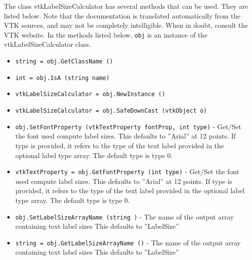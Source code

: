 The class vtkLabelSizeCalculator has several methods that can be used.
  They are listed below.
Note that the documentation is translated automatically from the VTK sources,
and may not be completely intelligible.  When in doubt, consult the VTK website.
In the methods listed below, \verb|obj| is an instance of the vtkLabelSizeCalculator class.
\begin{itemize}
\item  \verb|string = obj.GetClassName ()|

\item  \verb|int = obj.IsA (string name)|

\item  \verb|vtkLabelSizeCalculator = obj.NewInstance ()|

\item  \verb|vtkLabelSizeCalculator = obj.SafeDownCast (vtkObject o)|

\item  \verb|obj.SetFontProperty (vtkTextProperty fontProp, int type)| -  Get/Set the font used compute label sizes.
 This defaults to ''Arial'' at 12 points.
 If type is provided, it refers to the type of the text label provided
 in the optional label type array. The default type is type 0.

\item  \verb|vtkTextProperty = obj.GetFontProperty (int type)| -  Get/Set the font used compute label sizes.
 This defaults to ''Arial'' at 12 points.
 If type is provided, it refers to the type of the text label provided
 in the optional label type array. The default type is type 0.

\item  \verb|obj.SetLabelSizeArrayName (string )| -  The name of the output array containing text label sizes
 This defaults to ''LabelSize''

\item  \verb|string = obj.GetLabelSizeArrayName ()| -  The name of the output array containing text label sizes
 This defaults to ''LabelSize''

\end{itemize}
